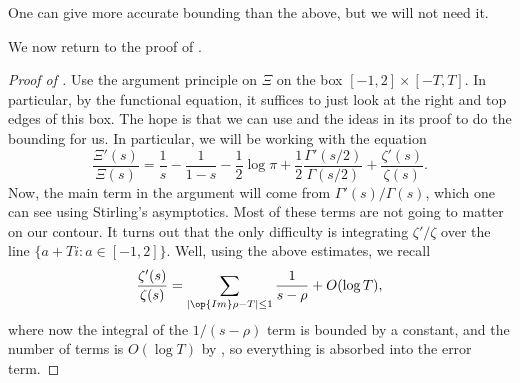 \documentclass[../notes.tex]{subfiles}
\begin{document}
\begin{remark}
	One can give more accurate bounding than the above, but we will not need it.
\end{remark}
We now return to the proof of .
\begin{proof}[Proof of ]
	Use the argument principle on $\Xi$ on the box $[-1,2]\times[-T,T]$. In particular, by the functional equation, it suffices to just look at the right and top edges of this box. The hope is that we can use  and the ideas in its proof to do the bounding for us. In particular, we will be working with the equation
	\[\frac{\Xi'(s)}{\Xi(s)}=\frac1s-\frac1{1-s}-\frac12\log\pi+\frac12\frac{\Gamma'(s/2)}{\Gamma(s/2)}+\frac{\zeta'(s)}{\zeta(s)}.\]
	Now, the main term in the argument will come from $\Gamma'(s)/\Gamma(s)$, which one can see using Stirling's asymptotics. Most of these terms are not going to matter on our contour. It turns out that the only difficulty is integrating $\zeta'/\zeta$ over the line $\{a+Ti:a\in[-1,2]\}$. Well, using the above estimates, we recall
	\[\frac{\zeta'(s)}{\zeta(s)}=\sum_{|\op{Im}\rho-T|\le1}\frac1{s-\rho}+O(\log T),\]
	where now the integral of the $1/(s-\rho)$ term is bounded by a constant, and the number of terms is $O(\log T)$ by , so everything is absorbed into the error term.
\end{proof}
\end{document}
